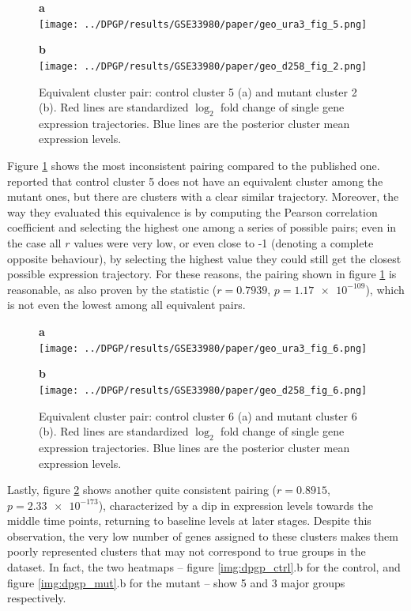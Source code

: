\begin{figure}[!ht]
    \centering
    \parbox{.4\textwidth}{
        \textbf{a}\\
        \texttt{[image: ../DPGP/results/GSE33980/paper/geo\_ura3\_fig\_5.png]}
    }
    \parbox{.4\textwidth}{
        \textbf{b}\\
        \texttt{[image: ../DPGP/results/GSE33980/paper/geo\_d258\_fig\_2.png]}
    }
    \caption[Equivalent cluster 5 pair]{Equivalent cluster pair: control cluster 5 (a) and mutant cluster 2 (b). Red lines are standardized $\log_{2}$ fold change of single gene expression trajectories. Blue lines are the posterior cluster mean expression levels.}\label{img:clust5}
\end{figure}

Figure \ref{img:clust5} shows the most inconsistent pairing compared to the published one. \citeauthor{mcdowellClusteringGeneExpression2018} reported that control cluster 5 does not have an equivalent cluster among the mutant ones, but there are clusters with a clear similar trajectory. Moreover, the way they evaluated this equivalence is by computing the Pearson correlation coefficient and selecting the highest one among a series of possible pairs; even in the case all $r$ values were very low, or even close to -1 (denoting a complete opposite behaviour), by selecting the highest value they could still get the closest possible expression trajectory. For these reasons, the pairing shown in figure \ref{img:clust5} is reasonable, as also proven by the statistic ($r=\num{0.7939}$, $p=\num{1.17e-109}$), which is not even the lowest among all equivalent pairs.

\begin{figure}[!ht]
    \centering
    \parbox{.4\textwidth}{
        \textbf{a}\\
        \texttt{[image: ../DPGP/results/GSE33980/paper/geo\_ura3\_fig\_6.png]}
    }
    \parbox{.4\textwidth}{
        \textbf{b}\\
        \texttt{[image: ../DPGP/results/GSE33980/paper/geo\_d258\_fig\_6.png]}
    }
    \caption[Equivalent cluster 6 pair]{Equivalent cluster pair: control cluster 6 (a) and mutant cluster 6 (b). Red lines are standardized $\log_{2}$ fold change of single gene expression trajectories. Blue lines are the posterior cluster mean expression levels.}\label{img:clust6}
\end{figure}

Lastly, figure \ref{img:clust6} shows another quite consistent pairing ($r=\num{0.8915}$, $p=\num{2.33e-173}$), characterized by a dip in expression levels towards the middle time points, returning to baseline levels at later stages. Despite this observation, the very low number of genes assigned to these clusters makes them poorly represented clusters that may not correspond to true groups in the dataset. In fact, the two heatmaps -- figure \ref{img:dpgp_ctrl}.b for the control, and figure \ref{img:dpgp_mut}.b for the mutant -- show 5 and 3 major groups respectively.


